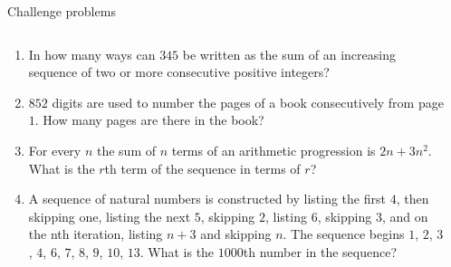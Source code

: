 \documentclass[9pt,aspectratio=169]{beamer}
\begin{document}
\begin{frame}{Challenge problems}
  \begin{columns}[T]
    \begin{column}{0.5\textwidth}
      \begin{enumerate}
        \item In how many ways can $345$ be written as the sum of an increasing sequence of two or more consecutive positive integers? %
        \item $852$ digits are used to number the pages of a book consecutively from page $1$. How many pages
        are there in the book? %
        \item For every $n$ the sum of $n$ terms of an arithmetic progression is $2n + 3n^2$. What is the $r$th term of
        the sequence in terms of $r$?
        \item A sequence of natural numbers is constructed by listing the first
        $4$, then skipping one, listing the next $5$, skipping $2$, listing $6$, skipping $3$, and on the nth
        iteration, listing $n + 3$ and skipping $n$. The sequence begins $1$, $2$, $3$, $4$, $6$, $7$, $8$, $9$, $10$, $13$.
        What is the $1000$th number in the sequence? %
      \end{enumerate}
    \end{column}
    \begin{column}{0.5\textwidth}
    \end{column}
  \end{columns}
\end{frame}
\end{document}
